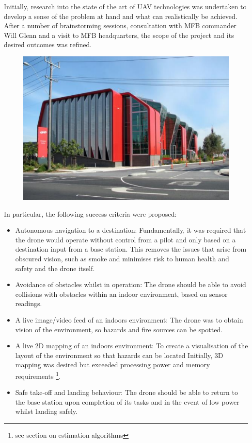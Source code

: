 \documentclass[capstone_report.tex]{subfiles}
\begin{document}
Initially, research into the state of the art of UAV technologies was undertaken to develop a sense of the problem at hand and what can realistically be achieved. After a number of brainstorming sessions, consultation with MFB commander Will Glenn and a visit to MFB headquarters, the scope of the project and its desired outcomes was refined. \\

    \begin{figure}[H]  
	\centering
        \includegraphics[width=0.6\linewidth]{imgs/mfbBurnley.png}
        \label{fig:mfbBurnley}
    \end{figure}

In particular, the following success criteria were proposed:
\begin{itemize}
	\item Autonomous navigation to a destination: Fundamentally, it was required that the drone would operate without control from a pilot and only based on a destination input from a base station. This removes the issues that arise from obscured vision, such as smoke and minimises risk to human health and safety and the drone itself.
	\item Avoidance of obstacles whilst in operation: The drone should be able to avoid collisions with obstacles within an indoor environment, based on sensor readings.
	\item A live image/video feed of an indoors environment: The drone was to obtain vision of the environment, so hazards and fire sources can be spotted.
	\item A live 2D mapping of an indoors environment: To create a visualisation of the layout of the environment so that hazards can be located Initially, 3D mapping was desired but exceeded processing power and memory requirements \footnote{see section on estimation algorithms}.
	\item Safe take-off and landing behaviour: The drone should be able to return to the base station upon completion of its tasks and in the event of low power whilst landing safely. 
\end{itemize}
\end{document}
